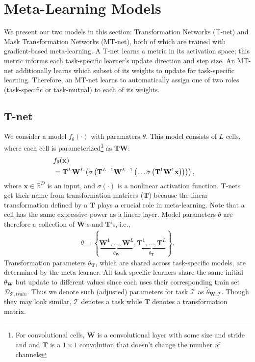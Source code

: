 \documentclass{article}
\newcommand{\bx}{\mathbf{x}}
\newcommand{\calD}{{\mathcal{D}}}
\newcommand{\calT}{{\mathcal{T}}}
\newcommand{\Real}{\mathbb R}
\newcommand{\0}{{\bf 0}}
\newcommand{\be}{\begin{eqnarray}}
\newcommand{\ee}{\end{eqnarray}}
\newcommand{\bee}{\begin{eqnarray*}}
\newcommand{\eee}{\end{eqnarray*}}
\newcommand{\x}{\mathbf{x}}
\newcommand{\W}{\mathbf{W}}
\newcommand{\T}{\mathbf{T}}
\begin{document}
\section{Meta-Learning Models}
\label{sec:main}

We present our two models in this section: Transformation Networks (T-net) and Mask Transformation Networks (MT-net),
 both of which are trained with gradient-based meta-learning.
A T-net learns a metric in its activation space;
this metric informs each task-specific learner's update direction and step size.
An MT-net additionally learns which subset of its weights to update for task-specific learning.
Therefore, an MT-net learns to automatically assign one of two roles (task-specific or task-mutual) to each of its weights.


\subsection{T-net}
\label{subsec:tnet}

We consider a model $f_{\theta} (\cdot)$ with paramaters $\theta$.
This model consists of $L$ cells, where each cell is parameterized\footnote{
For convolutional cells, $\W$ is a convolutional layer with some size and stride and
and $\T$ is a $1 \times 1$ convolution that doesn't change the number of channels
} as $\T \W$:
\be
\label{eq:tmodel}
\lefteqn{ f_{\theta}(\x)} \nonumber \\
& =  \T^L \W^L \left( \sigma \left( \T^{L-1} \W^{L-1} \left( \ldots 
\sigma \left(  \T^1 \W^1 \x \right) \right) \right) \right),  
\ee
where $\bx \in \Real^{D}$ is an input, and $\sigma(\cdot)$ is a nonlinear activation function.
T-nets get their name from transformation matrices ($\T$) because the linear transformation defined by a $\T$ plays a crucial role in meta-learning.
Note that a cell has the same expressive power as a linear layer.
Model parameters $\theta$ are therefore a collection of $\W$'s and $\T$'s, i.e.,
\bee
\theta =\left\{ \underbrace{\W^1, \ldots, \W^L}_{\theta_{\W}}, 
\underbrace{\T^1, \ldots, \T^L}_{\theta_{\T}}  \right\}.
\eee
Transformation parameters $\theta_{\T}$, which are shared across task-specific models, are determined by the meta-learner.
All task-specific learners share the same initial $\theta_{\W}$ but update to different values since each uses their corresponding train set $\calD_{\calT,train}$.
Thus we denote such (adjusted) parameters for task $\calT$ as $\widetilde{\theta}_{\W,\calT}$.
Though they may look similar, $\calT$ denotes a task while $\T$ denotes a transformation matrix.
\end{document}
